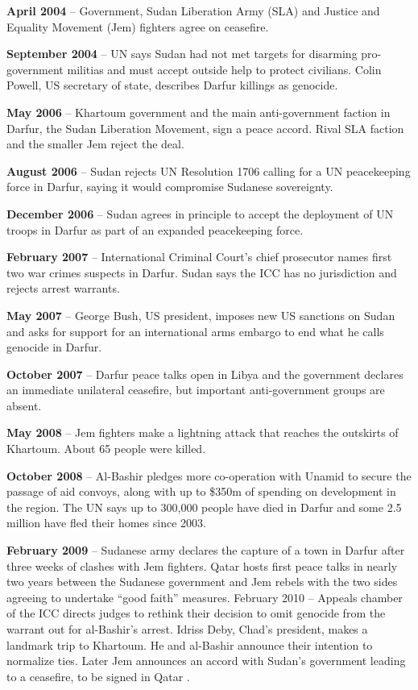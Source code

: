 \documentclass[14pt,a4paper]{article}
\begin{document}
\textbf{April 2004} – Government, Sudan Liberation Army (SLA) and Justice and Equality Movement (Jem) fighters agree on ceasefire.

\textbf{September 2004} – UN says Sudan had not met targets for disarming pro-government militias and must accept outside help to protect civilians. Colin Powell, US secretary of state, describes Darfur killings as genocide.

\textbf{May 2006} – Khartoum government and the main anti-government faction in Darfur, the Sudan Liberation Movement, sign a peace accord. Rival SLA faction and the smaller Jem reject the deal.

\textbf{August 2006} – Sudan rejects UN Resolution 1706 calling for a UN peacekeeping force in Darfur, saying it would compromise Sudanese sovereignty.

\textbf{December 2006} – Sudan agrees in principle to accept the deployment of UN troops in Darfur as part of an expanded peacekeeping force.

\textbf{February 2007} – International Criminal Court’s chief prosecutor names first two war crimes suspects in Darfur. Sudan says the ICC has no jurisdiction and rejects arrest warrants.

\textbf{May 2007} – George Bush, US president, imposes new US sanctions on Sudan and asks for support for an international arms embargo to end what he calls genocide in Darfur.

\textbf{October 2007} – Darfur peace talks open in Libya and the government declares an immediate unilateral ceasefire, but important anti-government groups are absent.

\textbf{May 2008} – Jem fighters make a lightning attack that reaches the outskirts of Khartoum. About 65 people were killed.

\textbf{October 2008} – Al-Bashir pledges more co-operation with Unamid to secure the passage of aid convoys, along with up to \$350m of spending on development in the region. The UN says up to 300,000 people have died in Darfur and some 2.5 million have fled their homes since 2003.

\textbf{February 2009} – Sudanese army declares the capture of a town in Darfur after three weeks of clashes with Jem fighters. Qatar hosts first peace talks in nearly two years between the Sudanese government and Jem rebels with the two sides agreeing to undertake “good faith” measures.
February 2010 – Appeals chamber of the ICC directs judges to rethink their decision to omit genocide from the warrant out for al-Bashir’s arrest. Idriss Deby, Chad’s president, makes a landmark trip to Khartoum. He and al-Bashir announce their intention to normalize ties. Later Jem announces an accord with Sudan’s government leading to a ceasefire, to be signed in Qatar \cite{AlJazeera}.
\end{document}

